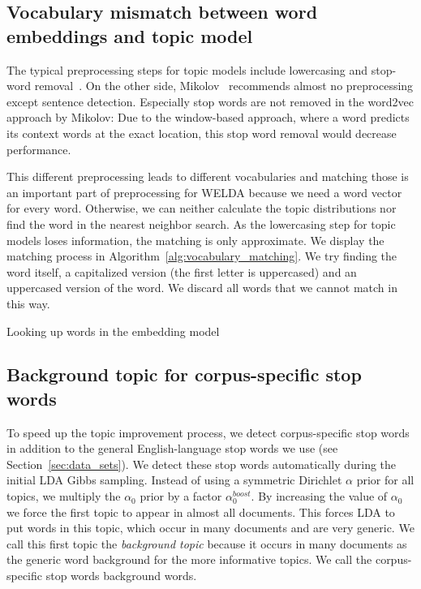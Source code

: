 \documentclass[
        a4paper,
        titlepage,
        twoside,
        parskip,
        numbers=noenddot
        ]{scrbook}
\theoremstyle{break}
\begin{document}
\subsection{Vocabulary mismatch between word embeddings and topic model}
\label{sec:vocabulary_mismatch}
The typical preprocessing steps for topic models include lowercasing and stop-word removal~\cite{Boyd-graber2014}.
On the other side, Mikolov~\cite{Mikolov2013d} recommends almost no preprocessing except sentence detection.
Especially stop words are not removed in the word2vec approach by Mikolov:
Due to the window-based approach, where a word predicts its context words at the exact location, this stop word removal would decrease performance.

This different preprocessing leads to different vocabularies and matching those is an important part of preprocessing for WELDA because we need a word vector for every word.
Otherwise, we can neither calculate the topic distributions nor find the word in the nearest neighbor search.
As the lowercasing step for topic models loses information, the matching is only approximate.
We display the matching process in Algorithm~\ref{alg:vocabulary_matching}.
We try finding the word itself, a capitalized version (the first letter is uppercased) and an uppercased version of the word.
We discard all words that we cannot match in this way.

\begin{algorithm}
  \caption{Looking up words in the embedding model}
  \label{alg:vocabulary_matching}
  \begin{algorithmic}[1]
      \State{}
      \State{}
      \State{}
    \Else
    \EndIf
    \EndProcedure
  \end{algorithmic}
\end{algorithm}

\subsection{Background topic for corpus-specific stop words}
\label{sec:background_topic}
To speed up the topic improvement process, we detect corpus-specific stop words in addition to the general English-language stop words we use (see Section~\ref{sec:data_sets}).
We detect these stop words automatically during the initial LDA Gibbs sampling.
Instead of using a symmetric Dirichlet $\alpha$ prior for all topics, we multiply the $\alpha_0$ prior by a factor $\alpha_0^{boost}$.
By increasing the value of $\alpha_0$ we force the first topic to appear in almost all documents.
This forces LDA to put words in this topic, which occur in many documents and are very generic.
We call this first topic the \emph{background topic} because it occurs in many documents as the generic word background for the more informative topics.
We call the corpus-specific stop words background words.
\end{document}
